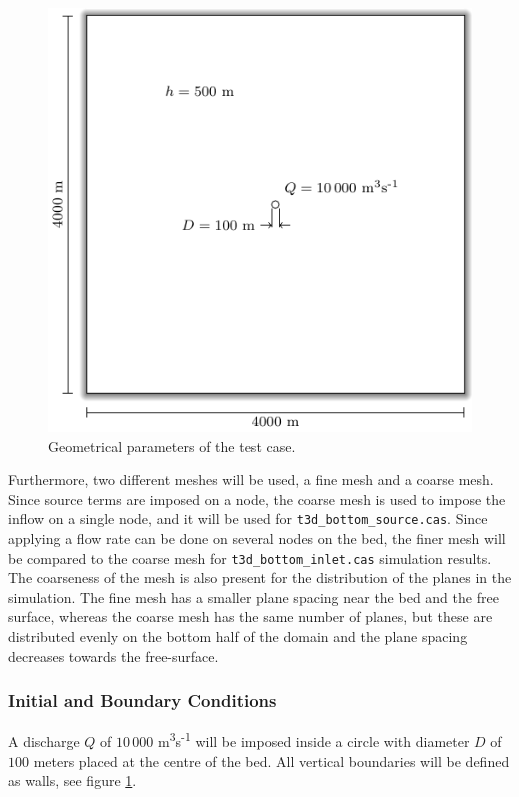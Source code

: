 \begin{figure}[t!]
\begin{center}
	\includegraphics[]{GeomPlan.pdf}
\end{center}
\caption{Geometrical parameters of the test case.}
\label{fig:GeomPlan}
\end{figure}

Furthermore, two different meshes will be used, a fine mesh and a coarse mesh.
Since source terms are imposed on a node, the coarse mesh is used to impose the
inflow on a single node, and it will be used for
\texttt{t3d\_bottom\_source.cas}. Since applying a flow rate can be done on
several nodes on the bed, the finer mesh will be compared to the coarse mesh
for \texttt{t3d\_bottom\_inlet.cas} simulation results. The coarseness of the
mesh is also present for the distribution of the planes in the simulation. The
fine mesh has a smaller plane spacing near the bed and the free surface,
whereas the coarse mesh has the same number of planes, but these are
distributed evenly on the bottom half of the domain and the plane spacing
decreases towards the free-surface.

%
%
\subsubsection{Initial and Boundary Conditions}
%
A discharge $Q$ of $10\,000$ m\textsuperscript{3}s\textsuperscript{-1} will be
imposed inside a circle with diameter $D$ of $100$ meters placed at the centre
of the bed. All vertical boundaries will be defined as walls, see figure
\ref{fig:GeomPlan}.


